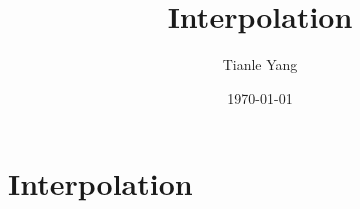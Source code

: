 \documentclass[sectionlevel=section,status=draft]{noteformyself}
\title{Interpolation}
\author{Tianle Yang}
\date{\today}
\begin{document}
    \maketitle

    \section[
      status=draft,
      tag=00000,
      label=\labelNFM{sec:p-adic-method:interpolation}
    ]{Interpolation}



    \printbibliography[heading=bibintoc, title={References}] %
\end{document}
